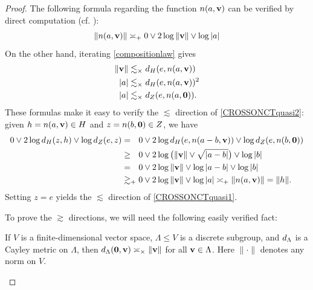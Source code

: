 {\begin{proof}
The following formula regarding the function $n(a,\mathbf v)$ can be verified by direct computation (cf. \cite[(3.5)]{CorletteIozzi}):
\begin{equation}
\label{corletteiozzi}
\|n(a,\mathbf v)\| \asymp_+ 0\vee 2\log\|\mathbf v\| \vee \log|a|
\end{equation}
On the other hand, iterating \eqref{compositionlaw} gives
\begin{equation}
\label{compositionlawbounds}
\begin{split}
\|\mathbf v\| &\lesssim_\times d_H(e,n(a,\mathbf v))\\
|a| &\lesssim_\times d_H(e,n(a,\mathbf v))^2\\
|a| &\lesssim_\times d_Z(e,n(a,\mathbf 0)).
\end{split}
\end{equation}
These formulas make it easy to verify the $\lesssim$ direction of \eqref{CROSSONCTquasi2}: given $h = n(a,\mathbf v)\in H$ and $z = n(b,\mathbf 0)\in Z$, we have
\begin{align*}
0\vee 2\log\dist_H(z,h) \vee \log\dist_Z(e,z)
&=_\pt 0\vee 2\log\dist_H(e,n(a - b,\vv)) \vee \log\dist_Z(e,n(b,\0))\\
&\geq_\pt 0\vee 2\log\big(\|\vv\|\vee \sqrt{|a - b|}\big)\vee \log|b|\\
&=_\pt 0\vee 2\log\|\vv\| \vee \log|a - b| \vee\log|b|\\
&\gtrsim_\plus 0\vee 2\log\|\vv\| \vee \log|a| \asymp_\plus \dogo{n(a,\vv)} = \dogo h.
\end{align*}
Setting $z = e$ yields the $\lesssim$ direction of \eqref{CROSSONCTquasi1}.

To prove the $\gtrsim$ directions, we will need the following easily verified fact:

\begin{fact}
\label{factFDVS}
If $V$ is a finite-dimensional vector space, $\Lambda\leq V$ is a discrete subgroup, and $d_\Lambda$ is a Cayley metric on $\Lambda$, then $d_\Lambda(\mathbf 0,\mathbf v) \asymp_\times \|\mathbf v\|$ for all $\mathbf v\in\Lambda$. Here $\|\cdot\|$ denotes any norm on $V$.
\end{fact}


\end{proof}}
